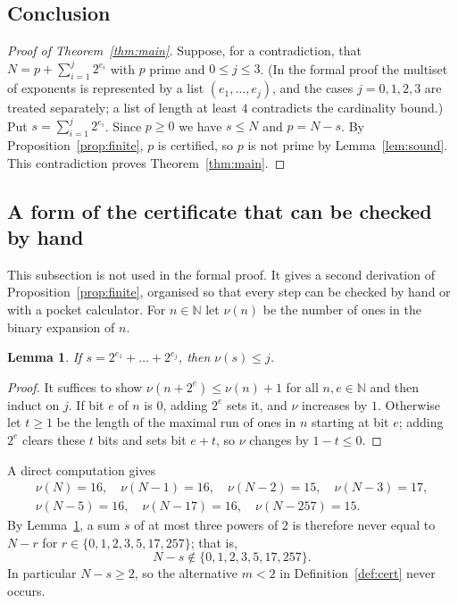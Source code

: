 \documentclass[11pt]{amsart}
\theoremstyle{plain}
\newtheorem{lemma}[theorem]{Lemma}
\theoremstyle{definition}
\newcommand{\N}{\mathbb{N}}
\newcommand{\wt}{\nu}
\begin{document}
\subsection{Conclusion}
\begin{proof}[Proof of Theorem~\ref{thm:main}]
Suppose, for a contradiction, that $N=p+\sum_{i=1}^{j}2^{e_i}$ with $p$ prime and $0\le j\le 3$.
(In the formal proof the multiset of exponents is represented by a list $(e_1,\dots,e_j)$, and the cases $j=0,1,2,3$ are treated separately; a list of length at least $4$ contradicts the cardinality bound.)
Put $s=\sum_{i=1}^{j}2^{e_i}$. Since $p\ge 0$ we have $s\le N$ and $p=N-s$.
By Proposition~\ref{prop:finite}, $p$ is certified, so $p$ is not prime by Lemma~\ref{lem:sound}. This contradiction proves Theorem~\ref{thm:main}.
\end{proof}

\subsection{A form of the certificate that can be checked by hand}\label{sec:hand}
This subsection is not used in the formal proof. It gives a second derivation of Proposition~\ref{prop:finite}, organised so that every step can be checked by hand or with a pocket calculator.
For $n\in\N$ let $\wt(n)$ be the number of ones in the binary expansion of $n$.

\begin{lemma}\label{lem:weight}
If $s=2^{e_1}+\dots+2^{e_j}$, then $\wt(s)\le j$.
\end{lemma}

\begin{proof}
It suffices to show $\wt(n+2^e)\le \wt(n)+1$ for all $n,e\in\N$ and then induct on $j$. If bit $e$ of $n$ is $0$, adding $2^e$ sets it, and $\wt$ increases by $1$. Otherwise let $t\ge 1$ be the length of the maximal run of ones in $n$ starting at bit $e$; adding $2^e$ clears these $t$ bits and sets bit $e+t$, so $\wt$ changes by $1-t\le 0$.
\end{proof}

A direct computation gives
\[
\begin{gathered}
\wt(N)=16,\quad \wt(N-1)=16,\quad \wt(N-2)=15,\quad \wt(N-3)=17,\\
\wt(N-5)=16,\quad \wt(N-17)=16,\quad \wt(N-257)=15.
\end{gathered}
\]
By Lemma~\ref{lem:weight}, a sum $s$ of at most three powers of $2$ is therefore never equal to $N-r$ for $r\in\{0,1,2,3,5,17,257\}$; that is,
\begin{equation}\label{eq:excl}
N-s\notin\{0,1,2,3,5,17,257\}.
\end{equation}
In particular $N-s\ge 2$, so the alternative $m<2$ in Definition~\ref{def:cert} never occurs.
\end{document}
